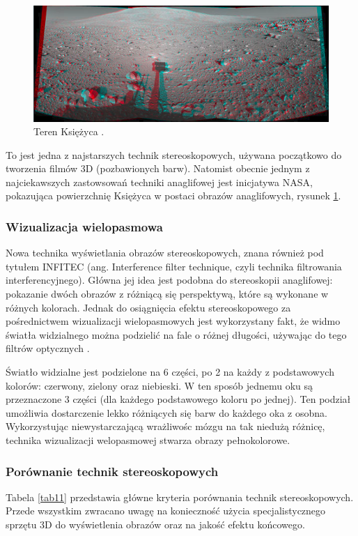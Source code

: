 \begin{figure}[H]
		\centering
 		\includegraphics[width=13cm]{NASA.png}
    	\caption{Teren Księżyca \cite{anaglif}.}
 		\label{rys4}
\end{figure}

To jest jedna z najstarszych technik stereoskopowych, używana początkowo do tworzenia filmów 3D (pozbawionych barw). Natomist obecnie jednym z najciekawszych zastowsowań techniki anaglifowej jest inicjatywa NASA, pokazująca powierzchnię Księżyca w postaci obrazów anaglifowych, rysunek \ref{rys4}. 

\newpage
\subsubsection{Wizualizacja wielopasmowa}
Nowa technika wyświetlania obrazów stereoskopowych, znana również pod tytułem INFITEC (ang. Interference filter technique, czyli technika filtrowania interferencyjnego). Główna jej idea jest podobna do stereoskopii anaglifowej: pokazanie dwóch obrazów z różniącą się perspektywą, które są wykonane w różnych kolorach. Jednak do osiągnięcia efektu stereoskopowego za pośrednictwem wizualizacji wielopasmowych jest wykorzystany fakt, że widmo światła widzialnego można podzielić na fale o różnej długości, używając do tego filtrów optycznych \cite{infitec}.

Światło widzialne jest podzielone na 6 części, po 2 na każdy z podstawowych kolorów: czerwony, zielony oraz niebieski. W ten sposób jednemu oku są przeznaczone 3 części (dla każdego podstawowego koloru po jednej). Ten podział umożliwia dostarczenie lekko różniących się barw do każdego oka z osobna. Wykorzystując niewystarczającą wrażliwośc mózgu na tak niedużą różnicę, technika wizualizacji welopasmowej stwarza obrazy pełnokolorowe.  

\subsubsection{Porównanie technik stereoskopowych}
Tabela \ref{tab11} przedstawia główne kryteria porównania technik stereoskopowych. Przede wszystkim zwracano uwagę na konieczność użycia  specjalistycznego sprzętu 3D do wyświetlenia obrazów oraz na jakość efektu końcowego. 

